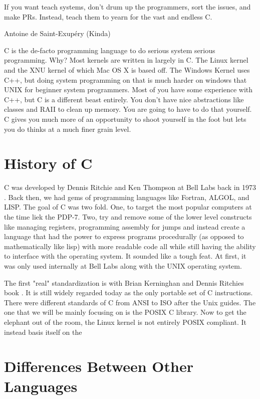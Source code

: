 
\epigraph{If you want teach systems, don't drum up the programmers, sort the issues, and make PRs. Instead, teach them to yearn for the vast and endless C.}{Antoine de Saint-Exup\'{e}ry (Kinda)}

C is the de-facto programming language to do serious system serious programming. Why? Most kernels are written in largely in C. The Linux kernel \cite{Love} and the XNU kernel \citet{xnukernel} of which Mac OS X is based off. The Windows Kernel uses C++, but doing system programming on that is much harder on windows that UNIX for beginner system programmers. Most of you have some experience with C++, but C is a different beast entirely. You don't have nice abstractions like classes and RAII to clean up memory. You are going to have to do that yourself. C gives you much more of an opportunity to shoot yourself in the foot but lets you do thinks at a much finer grain level.

\section{History of C}

C was developed by Dennis Ritchie and Ken Thompson at Bell Labs back in 1973 \cite{Ritchie:1993:DCL:155360.155580}. Back then, we had gems of programming languages like Fortran, ALGOL, and LISP. The goal of C was two fold. One, to target the most popular computers at the time liek the PDP-7. Two, try and remove some of the lower level constructs like managing registers, programming assembly for jumps and instead create a language that had the power to express programs procedurally (as opposed to mathematically like lisp) with more readable code all while still having the ability to interface with the operating system. It sounded like a tough feat. At first, it was only used internally at Bell Labs along with the UNIX operating system. 

The first "real" standardization is with Brian Kerninghan and Dennis Ritchies book \cite{kernighan1988c}. It is still widely regarded today as the only \gls{portable} set of C instructions. There were different standards of C from ANSI to ISO after the Unix guides. The one that we will be mainly focusing on is the \gls{POSIX} C library. Now to get the elephant out of the room, the Linux kernel is not entirely POSIX compliant. It instead basis itself on the 

\section{Differences Between Other Languages}

